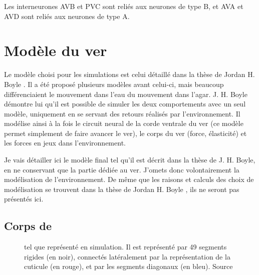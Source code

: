 Les interneurones AVB et PVC sont reliés aux neurones de type B, et AVA et AVD
sont reliés aux neurones de type A.




\section{Modèle du ver} %
\label{sec:Modèle du ver}

Le modèle choisi pour les simulations est celui détaillé dans la thèse de
Jordan H. Boyle \cite{Boyle2009}. Il a été proposé plusieurs modèles avant
celui-ci, mais beaucoup différenciaient le mouvement dans l'eau du mouvement
dans l'agar. J. H. Boyle démontre lui qu'il est possible de simuler les deux
comportements avec un seul modèle, uniquement en se servant des retours
réalisés par l'environnement. Il modélise ainsi à la fois le circuit neural de
la corde ventrale du ver (ce modèle permet simplement de faire avancer le ver),
le corps du ver (force, élasticité) et les forces en jeux dans l'environnement.

Je vais détailler ici le modèle final tel qu'il est décrit dans la thèse de J.
H. Boyle, en ne conservant que la partie dédiée au ver. J'omets donc
volontairement la modélisation de l'environnement. De même que les raisons et
calculs des choix de modélisation se trouvent dans la thèse de Jordan H. Boyle
\cite{Boyle2009}, ils ne seront pas présentés ici.\\

\subsection{Corps de \celeg{}} %
\label{sub:Corps de celeg}

\begin{figure}[ht]
   \begin{center}
   \end{center}
   \caption[Représentation de \celeg{} en simulation]{\celeg{} tel que représenté en simulation. Il est représenté
   par 49 segments rigides (en noir), connectés latéralement par la représentation
   de la cuticule (en rouge), et par les segments diagonaux (en bleu). Source \boylecite{}}
   \label{fig:celegans_representation}
\end{figure}

